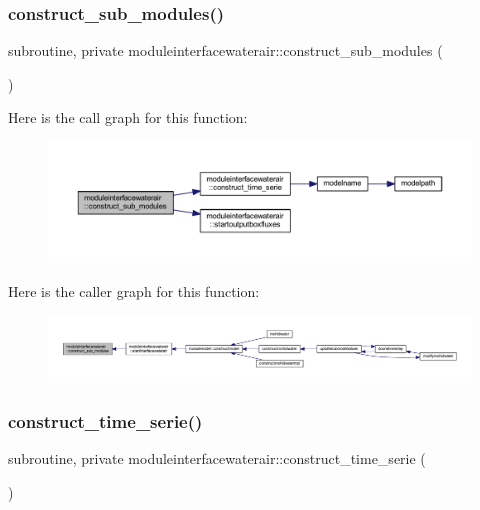 \subsubsection{\texorpdfstring{construct\+\_\+sub\+\_\+modules()}{construct\_sub\_modules()}}
{\footnotesize\ttfamily subroutine, private moduleinterfacewaterair\+::construct\+\_\+sub\+\_\+modules (\begin{DoxyParamCaption}{ }\end{DoxyParamCaption})\hspace{0.3cm}{\ttfamily [private]}}

Here is the call graph for this function\+:\nopagebreak
\begin{figure}[H]
\begin{center}
\leavevmode
\includegraphics[width=350pt]{namespacemoduleinterfacewaterair_a26e91289c0b811bff694b61c7a06fb15_cgraph}
\end{center}
\end{figure}
Here is the caller graph for this function\+:\nopagebreak
\begin{figure}[H]
\begin{center}
\leavevmode
\includegraphics[width=350pt]{namespacemoduleinterfacewaterair_a26e91289c0b811bff694b61c7a06fb15_icgraph}
\end{center}
\end{figure}
\mbox{\label{namespacemoduleinterfacewaterair_a49e85ee8a7b283a5ec88a2c8db419d3e}} 
\subsubsection{\texorpdfstring{construct\+\_\+time\+\_\+serie()}{construct\_time\_serie()}}
{\footnotesize\ttfamily subroutine, private moduleinterfacewaterair\+::construct\+\_\+time\+\_\+serie (\begin{DoxyParamCaption}{ }\end{DoxyParamCaption})\hspace{0.3cm}{\ttfamily [private]}}

